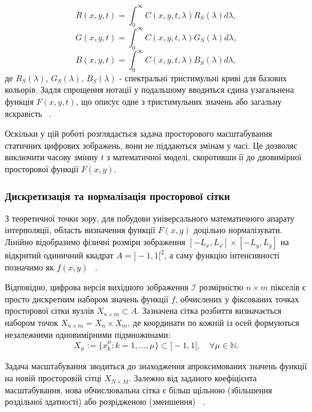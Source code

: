 \begin{equation}
	R(x, y, t) = \int_{0}^{\infty} C(x, y, t, \lambda) R_S(\lambda) d\lambda,
\end{equation}
\begin{equation}
	G(x, y, t) = \int_{0}^{\infty} C(x, y, t, \lambda) G_S(\lambda) d\lambda,
\end{equation}
\begin{equation}
	B(x, y, t) = \int_{0}^{\infty} C(x, y, t, \lambda) B_S(\lambda) d\lambda,
\end{equation}
де $R_S(\lambda)$, $G_S(\lambda)$, $B_S(\lambda)$ - спектральні тристимульні криві для базових кольорів. Задля спрощення нотації у подальшому вводиться єдина узагальнена функція $F(x, y, t)$, що описує одне з тристимульних значень або загальну яскравість ~\cite{pratt2014introduction}. 

Оскільки у цій роботі розглядається задача просторового масштабування статичних цифрових зображень, вони не піддаються змінам у часі. Це дозволяє виключити часову змінну $t$ з математичної моделі, скоротивши її до двовимірної просторової функції $F(x, y)$.

\subsubsection{Дискретизація та нормалізація просторової сітки}

З теоретичної точки зору, для побудови універсального математичного апарату інтерполяції, область визначення функції $F(x,y)$ доцільно нормалізувати. Лінійно відобразимо фізичні розміри зображення $[-L_x, L_x] \times [-L_y, L_y]$ на відкритий одиничний квадрат $A = ]-1, 1[^2$, а саму функцію інтенсивності позначимо як $f(x, y)$ ~\cite{occorsio2022lagrange}.

Відповідно, цифрова версія вихідного зображення $\mathcal{I}$ розмірністю $n \times m$ пікселів є просто дискретним набором значень функції $f$, обчислених у фіксованих точках просторової сітки вузлів $X_{n \times m} \subset A$. Зазначена сітка розбиття визначається набором точок $X_{n \times m} = X_n \times X_m$, де координати по кожній із осей формуються незалежними одновимірними підмножинами:
\begin{equation}\tag{1}
	X_\mu := \{x_k^\mu : k = 1, \dots, \mu\} \subset ]-1, 1[, \quad \forall \mu \in \mathbb{N}.
\end{equation}

Задача масштабування зводиться до знаходження апроксимованих значень функції на новій просторовій сітці $X_{N \times M}$. Залежно від заданого коефіцієнта масштабування, нова обчислювальна сітка є більш щільною (збільшення роздільної здатності) або розрідженою (зменшення) ~\cite{occorsio2022lagrange}.

